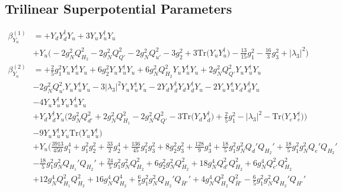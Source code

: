 \subsection{Trilinear Superpotential Parameters}
{\allowdisplaybreaks  \begin{align} 
\beta_{Y_u}^{(1)} & =  
+{Y_d  Y_{d}^{\dagger}  Y_u}+3 {Y_u  Y_{u}^{\dagger}  Y_u} \nonumber \\ 
 &+Y_u \Big(-2 g_{N}^{2} Q_{H_2}^{2}  -2 g_{N}^{2} Q_{Q'}^{2}  -2 g_{N}^{2} Q_{u'}^{2}  -3 g_{2}^{2}  + 3 \mbox{Tr}\Big({Y_u  Y_{u}^{\dagger}}\Big)  -\frac{13}{15} g_{1}^{2}  -\frac{16}{3} g_{3}^{2}  + |\lambda_3|^2\Big)\\ 
\beta_{Y_u}^{(2)} & =  
+\frac{2}{5} g_{1}^{2} {Y_u  Y_{u}^{\dagger}  Y_u} +6 g_{2}^{2} {Y_u  Y_{u}^{\dagger}  Y_u} +6 g_{N}^{2} Q_{H_2}^{2} {Y_u  Y_{u}^{\dagger}  Y_u} +2 g_{N}^{2} Q_{Q'}^{2} {Y_u  Y_{u}^{\dagger}  Y_u} \nonumber \\ 
 &-2 g_{N}^{2} Q_{u'}^{2} {Y_u  Y_{u}^{\dagger}  Y_u} -3 |\lambda_3|^2 {Y_u  Y_{u}^{\dagger}  Y_u} -2 {Y_d  Y_{d}^{\dagger}  Y_d  Y_{d}^{\dagger}  Y_u} -2 {Y_u  Y_{u}^{\dagger}  Y_d  Y_{d}^{\dagger}  Y_u} \nonumber \\ 
 &-4 {Y_u  Y_{u}^{\dagger}  Y_u  Y_{u}^{\dagger}  Y_u} \nonumber \\ 
 &+{Y_d  Y_{d}^{\dagger}  Y_u} \Big(2 g_{N}^{2} Q_{d'}^{2}  + 2 g_{N}^{2} Q_{H_1}^{2}  -2 g_{N}^{2} Q_{Q'}^{2}  -3 \mbox{Tr}\Big({Y_d  Y_{d}^{\dagger}}\Big)  + \frac{2}{5} g_{1}^{2}  - |\lambda_3|^2  - \mbox{Tr}\Big({Y_e  Y_{e}^{\dagger}}\Big) \Big)\nonumber \\ 
 &-9 {Y_u  Y_{u}^{\dagger}  Y_u} \mbox{Tr}\Big({Y_u  Y_{u}^{\dagger}}\Big) \nonumber \\ 
 &+Y_u \Big(\frac{3913}{450} g_{1}^{4} +g_{1}^{2} g_{2}^{2} +\frac{33}{2} g_{2}^{4} +\frac{136}{45} g_{1}^{2} g_{3}^{2} +8 g_{2}^{2} g_{3}^{2} +\frac{128}{9} g_{3}^{4} +\frac{18}{5} g_{1}^{2} g_{N}^{2} Q_d' Q_{H_2}' +\frac{18}{5} g_{1}^{2} g_{N}^{2} Q_e' Q_{H_2}' \nonumber \\ 
 &-\frac{18}{5} g_{1}^{2} g_{N}^{2} Q_{H_1}' Q_{H_2}' +\frac{24}{5} g_{1}^{2} g_{N}^{2} Q_{H_2}^{2} +6 g_{2}^{2} g_{N}^{2} Q_{H_2}^{2} +18 g_{N}^{4} Q_{d'}^{2} Q_{H_2}^{2} +6 g_{N}^{4} Q_{e'}^{2} Q_{H_2}^{2} \nonumber \\ 
 &+12 g_{N}^{4} Q_{H_1}^{2} Q_{H_2}^{2} +16 g_{N}^{4} Q_{H_2}^{4} +\frac{6}{5} g_{1}^{2} g_{N}^{2} Q_{H_2}' Q_{\bar{H}'}' +4 g_{N}^{4} Q_{H_2}^{2} Q_{\bar{H}'}^{2} -\frac{6}{5} g_{1}^{2} g_{N}^{2} Q_{H_2}' Q_{H'}' \nonumber \\ 

\end{align}}
